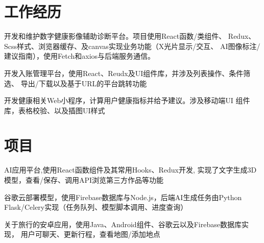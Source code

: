 \documentclass[]{deedy-resume-openfont}
\begin{document}
\begin{minipage}[t]{0.73\textwidth} 


\section{工作经历}
\sectionsep
{}
\vspace{\topsep}
\begin{tightemize}
    \item 开发和维护数字健康影像辅助诊断平台。项目使用React函数/类组件、
    Redux、Scss样式、浏览器缓存、及canvas实现业务功能（X光片显示/交互、
    AI图像标注/建议指南），使用Fetch和axios与后端服务通信。
    \item 开发入账管理平台，使用React、Reudx及UI组件库，并涉及列表操作、条件筛选、
    导出/下载以及基于URL的平台跳转功能
    \item 开发健康相关Web小程序，计算用户健康指标并给予建议。涉及移动端UI
    组件库，表格校验、以及插图UI样式
    
\end{tightemize}
\sectionsep


\section{项目}
\sectionsep
{}
\begin{tightemize}
    \item AI应用平台,使用React函数组件及其常用Hooks、Redux开发, 实现了文字生成3D模型，查看/保存、调用API浏览第三方作品等功能
    \item 谷歌云部署模型，使用Firebase数据库与Node.js，后端AI生成任务由Python Flask/Celery实现（任务队列、模型脚本调用、进度查询）

    \end{tightemize}

\sectionsep

\begin{tightemize}
    \item 关于旅行的安卓应用，使用Java、Android组件、谷歌云以及Firebase数据库实现，
    用户可聊天、更新行程，查看地图/添加地点
    \end{tightemize}


\end{minipage}
\end{document}
